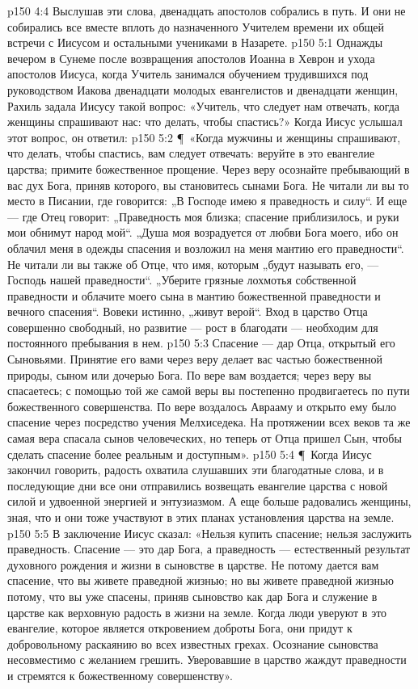 \vs p150 4:4 Выслушав эти слова, двенадцать апостолов собрались в путь. И они не собирались все вместе вплоть до назначенного Учителем времени их общей встречи с Иисусом и остальными учениками в Назарете.
\vs p150 5:1 Однажды вечером в Сунеме после возвращения апостолов Иоанна в Хеврон и ухода апостолов Иисуса, когда Учитель занимался обучением трудившихся под руководством Иакова двенадцати молодых евангелистов и двенадцати женщин, Рахиль задала Иисусу такой вопрос: «Учитель, что следует нам отвечать, когда женщины спрашивают нас: что делать, чтобы спастись?» Когда Иисус услышал этот вопрос, он ответил:
\vs p150 5:2 \P\ «Когда мужчины и женщины спрашивают, что делать, чтобы спастись, вам следует отвечать: веруйте в это евангелие царства; примите божественное прощение. Через веру осознайте пребывающий в вас дух Бога, приняв которого, вы становитесь сынами Бога. Не читали ли вы то место в Писании, где говорится: „В Господе имею я праведность и силу“. И еще --- где Отец говорит: „Праведность моя близка; спасение приблизилось, и руки мои обнимут народ мой“. „Душа моя возрадуется от любви Бога моего, ибо он облачил меня в одежды спасения и возложил на меня мантию его праведности“. Не читали ли вы также об Отце, что имя, которым „будут называть его, --- Господь нашей праведности“. „Уберите грязные лохмотья собственной праведности и облачите моего сына в мантию божественной праведности и вечного спасения“. Вовеки истинно, „живут верой“. Вход в царство Отца совершенно свободный, но развитие --- рост в благодати --- необходим для постоянного пребывания в нем.
\vs p150 5:3 Спасение --- дар Отца, открытый его Сыновьями. Принятие его вами через веру делает вас частью божественной природы, сыном или дочерью Бога. По вере вам воздается; через веру вы спасаетесь; с помощью той же самой веры вы постепенно продвигаетесь по пути божественного совершенства. По вере воздалось Аврааму и открыто ему было спасение через посредство учения Мелхиседека. На протяжении всех веков та же самая вера спасала сынов человеческих, но теперь от Отца пришел Сын, чтобы сделать спасение более реальным и доступным».
\vs p150 5:4 \P\ Когда Иисус закончил говорить, радость охватила слушавших эти благодатные слова, и в последующие дни все они отправились возвещать евангелие царства с новой силой и удвоенной энергией и энтузиазмом. А еще больше радовались женщины, зная, что и они тоже участвуют в этих планах установления царства на земле.
\vs p150 5:5 В заключение Иисус сказал: «Нельзя купить спасение; нельзя заслужить праведность. Спасение --- это дар Бога, а праведность --- естественный результат духовного рождения и жизни в сыновстве в царстве. Не потому дается вам спасение, что вы живете праведной жизнью; но вы живете праведной жизнью потому, что вы уже спасены, приняв сыновство как дар Бога и служение в царстве как верховную радость в жизни на земле. Когда люди уверуют в это евангелие, которое является откровением доброты Бога, они придут к добровольному раскаянию во всех известных грехах. Осознание сыновства несовместимо с желанием грешить. Уверовавшие в царство жаждут праведности и стремятся к божественному совершенству».
